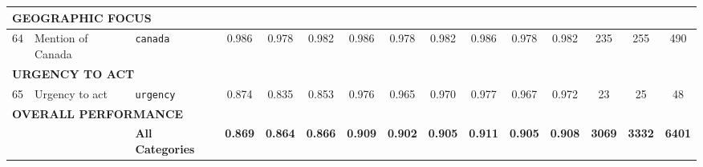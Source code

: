 \begin{longtable}{p{0.4cm}p{4.0cm}p{3.0cm}cccccccccccc}
\midrule
\multicolumn{15}{l}{\cellcolor{gray!10}\textbf{GEOGRAPHIC FOCUS}} \\
\midrule
64 & Mention of Canada & \texttt{canada} & 0.986 & 0.978 & 0.982 & 0.986 & 0.978 & 0.982 & 0.986 & 0.978 & 0.982 & 235 & 255 & 490 \\
\midrule
\multicolumn{15}{l}{\cellcolor{gray!10}\textbf{URGENCY TO ACT}} \\
\midrule
65 & Urgency to act & \texttt{urgency} & 0.874 & 0.835 & 0.853 & 0.976 & 0.965 & 0.970 & 0.977 & 0.967 & 0.972 & 23 & 25 & 48 \\
\midrule
\multicolumn{15}{l}{\cellcolor{gray!20}\textbf{OVERALL PERFORMANCE}} \\
& & \textbf{All Categories} & \textbf{0.869} & \textbf{0.864} & \textbf{0.866} & \textbf{0.909} & \textbf{0.902} & \textbf{0.905} & \textbf{0.911} & \textbf{0.905} & \textbf{0.908} & \textbf{3069} & \textbf{3332} & \textbf{6401} \\
\bottomrule
\end{longtable}